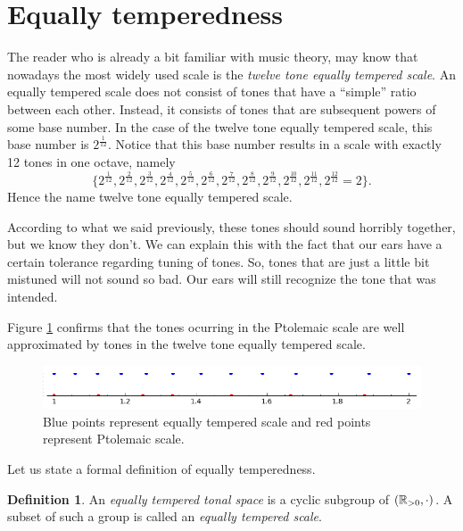 \documentclass[a4paper]{book}
\theoremstyle{definition}
\newtheorem{definition}[theorem]{Definition}
\begin{document}
\section{Equally temperedness}
\label{section_equally_temperedness}
The reader who is already a bit familiar with music theory, may know that nowadays the most widely used scale is the \emph{twelve tone equally tempered scale}.
An equally tempered scale does not consist of tones that have a ``simple'' ratio between each other.
Instead, it consists of tones that are subsequent powers of some base number.
In the case of the twelve tone equally tempered scale, this base number is $2^\frac{1}{12}$.
Notice that this base number results in a scale with exactly 12 tones in one octave, namely \[\{2^\frac{1}{12},2^\frac{2}{12},2^\frac{3}{12},2^\frac{4}{12},2^\frac{5}{12},2^\frac{6}{12},2^\frac{7}{12},2^\frac{8}{12},2^\frac{9}{12},2^\frac{10}{12},2^\frac{11}{12}, 2^\frac{12}{12} = 2\}.\]
Hence the name twelve tone equally tempered scale.

According to what we said previously, these tones should sound horribly together, but we know they don't.
We can explain this with the fact that our ears have a certain tolerance regarding tuning of tones.
So, tones that are just a little bit mistuned will not sound so bad.
Our ears will still recognize the tone that was intended.

Figure \ref{equally_temperedness} confirms that the tones ocurring in the Ptolemaic scale are well approximated by tones in the twelve tone equally tempered scale.

\begin{figure}[H]
    \centering
    \includegraphics[scale=0.65]{figures/equally_temperedness.png}
    \caption{Blue points represent equally tempered scale and red points represent Ptolemaic scale.}
    \label{equally_temperedness}
\end{figure}

Let us state a formal definition of equally temperedness.

\begin{definition}
    An \emph{equally tempered tonal space} is a cyclic subgroup of $(\mathbb{R}_{> 0},\cdot)$.
    A subset of such a group is called an \emph{equally tempered scale}.
\end{definition}
\end{document}

